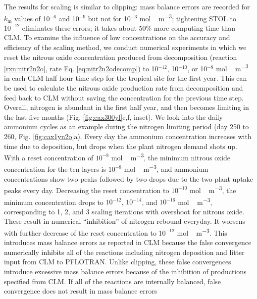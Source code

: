 \documentclass[gmd, manuscript]{copernicus}
\begin{document}
The results for scaling is similar to clipping: mass balance errors are
recorded for $k_\text{m}$ values of 10$^{-6}$ and 10$^{-9}$ but not for
10$^{-3}$ \unit{mol\,m^{-3}};  tightening STOL to $10^{-12}$ eliminates these
errors; it takes about 50\% more computing time than CLM. To examine the
influence of low concentrations on the accuracy and efficiency of the scaling
method, we conduct numerical experiments in which we reset the nitrous oxide
concentration  produced from decomposition (reaction \ref{rxn:nitr2n2o}, rate
Eq. \ref{eq:nitr2n2odecomp}) to 10$^{-12}$, 10$^{-10}$, or 10$^{-8}$
\unit{mol\,m^{-3}} in each CLM half hour time step for the tropical site for
the first year. This can be used to calculate the nitrous oxide production rate
from decomposition and feed back to CLM without saving the concentration for
the previous time step. Overall, nitrogen is abundant in the first half year,
and then becomes limiting in the last five months (Fig. \ref{fig:cax300yl}e,f,
inset). We look into the daily ammonium cycles as an example during the
nitrogen limiting period (day 250 to 260, Fig. \ref{fig:cax1yn2o}a). Every day
the ammonium concentration increases with time due to deposition, but drops
when the plant nitrogen demand shots up. With a reset concentration of $10^{-8}$
\unit{mol\,m^{-3}}, the minimum nitrous oxide concentration for the ten layers
is $10^{-8}$ \unit{mol\,m^{-3}}, and ammonium concentrations show two peaks
followed by two drops due to the two  plant uptake peaks every day. Decreasing
the reset concentration to $10^{-10}$ \unit{mol\,m^{-3}}, the minimum
concentration drops to $10^{-12}$,  $10^{-14}$, and  $10^{-16}$
\unit{mol\,m^{-3}}, corresponding to 1, 2, and 3 scaling iterations with
overshoot for nitrous oxide. These result in numerical ``inhibition'' of nitrogen rebound
everyday. It worsens with further decrease of the reset concentration to
$10^{-12}$ \unit{mol\,m^{-3}}. This introduces mass balance errors as reported
in CLM because the false convergence numerically inhibits all of the reactions
including nitrogen deposition and litter input from CLM to PFLOTRAN.  Unlike
clipping, these false convergences introduce excessive mass balance errors
because of the inhibition of productions specified from CLM. If all of the reactions are
internally balanced, false convergence does not result in mass balance errors
\end{document}
